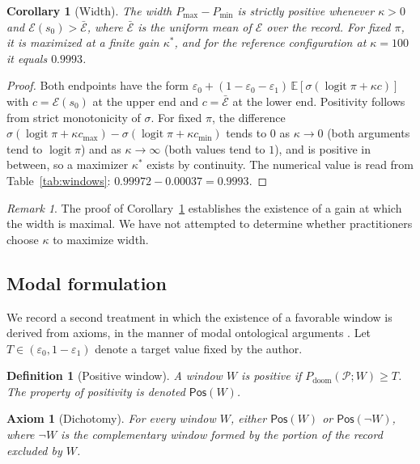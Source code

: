 \documentclass[11pt]{article}
\newtheorem{definition}{Definition}[section]
\newtheorem{axiom}{Axiom}[section]
\newtheorem{corollary}{Corollary}[section]
\theoremstyle{remark}
\newtheorem{remark}{Remark}[section]
\DeclareMathOperator{\logit}{logit}
\newcommand{\PD}{P_{\mathrm{doom}}}
\newcommand{\eone}{\varepsilon_1}
\newcommand{\ezero}{\varepsilon_0}
\newcommand{\Ex}{\mathbb{E}}
\begin{document}
\begin{corollary}[Width]\label{cor:width}
The width $P_{\max}-P_{\min}$ is strictly positive whenever $\kappa>0$ and $\mathcal{E}(s_0)>\bar{\mathcal{E}}$, where $\bar{\mathcal{E}}$ is the uniform mean of $\mathcal{E}$ over the record. For fixed $\pi$, it is maximized at a finite gain $\kappa^{\ast}$, and for the reference configuration at $\kappa=100$ it equals $0.9993$.
\end{corollary}
\begin{proof}
Both endpoints have the form $\ezero+(1-\ezero-\eone)\,\Ex[\sigma(\logit\pi+\kappa c)]$ with $c=\mathcal{E}(s_0)$ at the upper end and $c=\bar{\mathcal{E}}$ at the lower end. Positivity follows from strict monotonicity of $\sigma$. For fixed $\pi$, the difference $\sigma(\logit\pi+\kappa c_{\max})-\sigma(\logit\pi+\kappa c_{\min})$ tends to $0$ as $\kappa\to 0$ (both arguments tend to $\logit\pi$) and as $\kappa\to\infty$ (both values tend to $1$), and is positive in between, so a maximizer $\kappa^{\ast}$ exists by continuity. The numerical value is read from Table~\ref{tab:windows}: $0.99972-0.00037=0.9993$. \qedhere
\end{proof}

\begin{remark}
The proof of Corollary~\ref{cor:width} establishes the existence of a gain at which the width is maximal. We have not attempted to determine whether practitioners choose $\kappa$ to maximize width.
\end{remark}

\subsection{Modal formulation}

We record a second treatment in which the existence of a favorable window is derived from axioms, in the manner of modal ontological arguments \cite{godel1995}. Let $T\in(\ezero,1-\eone)$ denote a target value fixed by the author.

\begin{definition}[Positive window]\label{def:positive}
A window $W$ is \emph{positive} if $\PD(\mathcal{P};W)\ge T$. The property of positivity is denoted $\mathsf{Pos}(W)$.
\end{definition}

\begin{axiom}[Dichotomy]\label{ax:dich}
For every window $W$, either $\mathsf{Pos}(W)$ or $\mathsf{Pos}(\neg W)$, where $\neg W$ is the complementary window formed by the portion of the record excluded by $W$.
\end{axiom}
\end{document}

